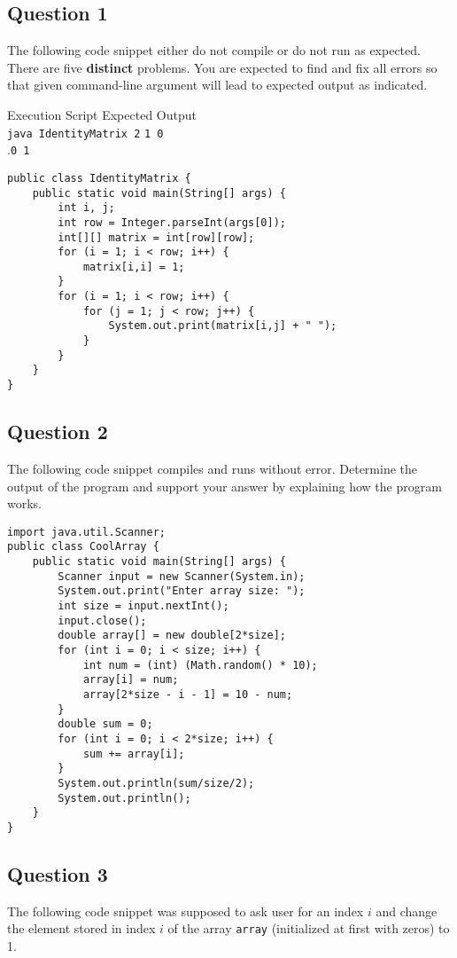 \subsection*{Question 1}
The following code snippet either do not compile or do not run as expected. There are five \textbf{distinct} problems. You are expected to find and fix all errors so that given command-line argument will lead to expected output as indicated.

Execution Script \hfill Expected Output\\
\texttt{java IdentityMatrix 2} \hfill \texttt{1 0}\\
.\hfill \texttt{0 1}

\begin{lstlisting}
public class IdentityMatrix {
	public static void main(String[] args) {
		int i, j;
		int row = Integer.parseInt(args[0]);
		int[][] matrix = int[row][row];
		for (i = 1; i < row; i++) {
			matrix[i,i] = 1;
		}
		for (i = 1; i < row; i++) {
			for (j = 1; j < row; j++) {
				System.out.print(matrix[i,j] + " ");
			}
		}
	}
}
\end{lstlisting}

\newpage
\subsection*{Question 2}
The following code snippet compiles and runs without error. Determine the output of the program and support your answer by explaining how the program works.
\begin{lstlisting}
import java.util.Scanner;
public class CoolArray {
	public static void main(String[] args) {
		Scanner input = new Scanner(System.in);
		System.out.print("Enter array size: ");
		int size = input.nextInt();
		input.close();
		double array[] = new double[2*size];
		for (int i = 0; i < size; i++) {
			int num = (int) (Math.random() * 10);
			array[i] = num;
			array[2*size - i - 1] = 10 - num;
		}
		double sum = 0;
		for (int i = 0; i < 2*size; i++) {
			sum += array[i];
		}
		System.out.println(sum/size/2);
		System.out.println();
	}
}
\end{lstlisting}

\newpage
\subsection*{Question 3}
The following code snippet was supposed to ask user for an index $i$ and change the element stored in index $i$ of the array \texttt{array} (initialized at first with zeros) to 1.

